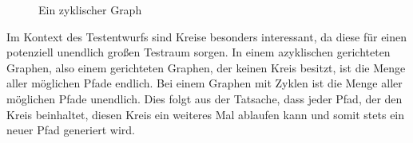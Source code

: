 \begin{figure}[h!]
    \centering
    \caption{Ein zyklischer Graph}
    \label{zyklgraph}
\end{figure}

Im Kontext des Testentwurfs sind Kreise besonders interessant, da diese für einen potenziell unendlich großen Testraum sorgen.
In einem azyklischen gerichteten Graphen, also einem gerichteten Graphen, der keinen Kreis besitzt, ist die Menge aller möglichen Pfade endlich.
Bei einem Graphen mit Zyklen ist die Menge aller möglichen Pfade unendlich.
Dies folgt aus der Tatsache, dass jeder Pfad, der den Kreis beinhaltet, diesen Kreis ein weiteres Mal ablaufen kann und somit stets ein neuer Pfad generiert wird.

\newpage